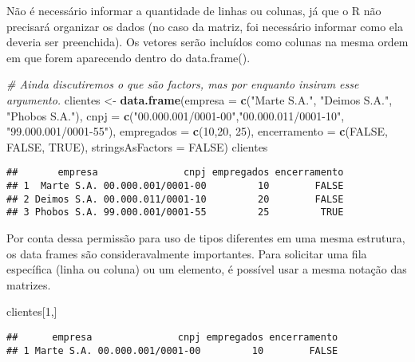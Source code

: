\documentclass[
]{book}
\newenvironment{Shaded}{\begin{snugshade}}{\end{snugshade}}
\newcommand{\CommentTok}[1]{\textcolor[rgb]{0.56,0.35,0.01}{\textit{#1}}}
\newcommand{\DataTypeTok}[1]{\textcolor[rgb]{0.13,0.29,0.53}{#1}}
\newcommand{\DecValTok}[1]{\textcolor[rgb]{0.00,0.00,0.81}{#1}}
\newcommand{\KeywordTok}[1]{\textcolor[rgb]{0.13,0.29,0.53}{\textbf{#1}}}
\newcommand{\NormalTok}[1]{#1}
\newcommand{\OtherTok}[1]{\textcolor[rgb]{0.56,0.35,0.01}{#1}}
\newcommand{\StringTok}[1]{\textcolor[rgb]{0.31,0.60,0.02}{#1}}
\begin{document}
Não é necessário informar a quantidade de linhas ou colunas, já que o R não precisará organizar os dados (no caso da matriz, foi necessário informar como ela deveria ser preenchida). Os vetores serão incluídos como colunas na mesma ordem em que forem aparecendo dentro do data.frame().

\begin{Shaded}
\begin{Highlighting}[]
\CommentTok{# Ainda discutiremos o que são factors, mas por enquanto insiram esse argumento.}
\NormalTok{clientes <-}\StringTok{ }\KeywordTok{data.frame}\NormalTok{(}\DataTypeTok{empresa =} \KeywordTok{c}\NormalTok{(}\StringTok{"Marte S.A."}\NormalTok{, }\StringTok{"Deimos S.A."}\NormalTok{, }\StringTok{"Phobos S.A."}\NormalTok{), }
                       \DataTypeTok{cnpj =} \KeywordTok{c}\NormalTok{(}\StringTok{"00.000.001/0001-00"}\NormalTok{,}\StringTok{"00.000.011/0001-10"}\NormalTok{, }\StringTok{"99.000.001/0001-55"}\NormalTok{),}
                       \DataTypeTok{empregados =} \KeywordTok{c}\NormalTok{(}\DecValTok{10}\NormalTok{,}\DecValTok{20}\NormalTok{, }\DecValTok{25}\NormalTok{), }
                       \DataTypeTok{encerramento =} \KeywordTok{c}\NormalTok{(}\OtherTok{FALSE}\NormalTok{, }\OtherTok{FALSE}\NormalTok{, }\OtherTok{TRUE}\NormalTok{),}
                       \DataTypeTok{stringsAsFactors =} \OtherTok{FALSE}\NormalTok{)}
\NormalTok{clientes}
\end{Highlighting}
\end{Shaded}

\begin{verbatim}
##       empresa               cnpj empregados encerramento
## 1  Marte S.A. 00.000.001/0001-00         10        FALSE
## 2 Deimos S.A. 00.000.011/0001-10         20        FALSE
## 3 Phobos S.A. 99.000.001/0001-55         25         TRUE
\end{verbatim}

Por conta dessa permissão para uso de tipos diferentes em uma mesma estrutura, os data frames são consideravalmente importantes. Para solicitar uma fila específica (linha ou coluna) ou um elemento, é possível usar a mesma notação das matrizes.

\begin{Shaded}
\begin{Highlighting}[]
\NormalTok{clientes[}\DecValTok{1}\NormalTok{,]}
\end{Highlighting}
\end{Shaded}

\begin{verbatim}
##      empresa               cnpj empregados encerramento
## 1 Marte S.A. 00.000.001/0001-00         10        FALSE
\end{verbatim}
\end{document}

